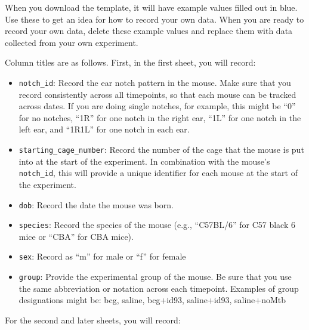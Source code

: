 \documentclass[
]{book}
\providecommand{\tightlist}{%
  \setlength{\itemsep}{0pt}\setlength{\parskip}{0pt}}
\begin{document}
When you download the template, it will have example values filled out in blue.
Use these to get an idea for how to record your own data. When you are ready
to record your own data, delete these example values and replace them with
data collected from your own experiment.

Column titles are as follows. First, in the first sheet, you will record:

\begin{itemize}
\tightlist
\item
  \texttt{notch\_id}: Record the ear notch pattern in the mouse. Make sure that you
  record consistently across all timepoints, so that each mouse can be tracked
  across dates. If you are doing single notches, for example, this might be ``0''
  for no notches, ``1R'' for one notch in the right ear, ``1L'' for one notch in the
  left ear, and ``1R1L'' for one notch in each ear.
\item
  \texttt{starting\_cage\_number}: Record the number of the cage that the mouse is put
  into at the start of the experiment. In combination with the mouse's \texttt{notch\_id},
  this will provide a unique identifier for each mouse at the start of the
  experiment.
\item
  \texttt{dob}: Record the date the mouse was born.
\item
  \texttt{species}: Record the species of the mouse (e.g., ``C57BL/6'' for C57 black 6 mice or
  ``CBA'' for CBA mice).
\item
  \texttt{sex}: Record as ``m'' for male or ``f'' for female
\item
  \texttt{group}: Provide the experimental group of the mouse. Be sure that you use the
  same abbreviation or notation across each timepoint. Examples of group
  designations might be: bcg, saline, bcg+id93, saline+id93, saline+noMtb
\end{itemize}

For the second and later sheets, you will record:
\end{document}
